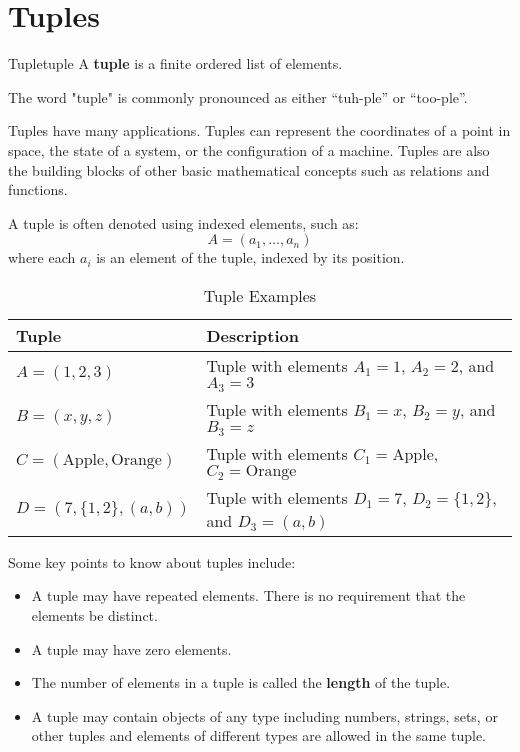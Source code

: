\section{Tuples}
\begin{definition}{Tuple}{tuple}
  A \textbf{tuple} is a finite ordered list of elements.
\end{definition}

The word "tuple" is commonly pronounced as either “tuh-ple” or “too-ple”.

Tuples have many applications. Tuples can represent the coordinates of a point in space,
the state of a system, or the configuration of a machine. Tuples are also the building
blocks of other basic mathematical concepts such as relations and functions.

A tuple is often denoted using indexed elements, such as:
\[
  A = (a_1, \ldots, a_n)
\]
where each \( a_i \) is an element of the tuple, indexed by its position.

\begin{table}[H]
  \centering
  \begin{tabular}{ll}
    \toprule
    \textbf{Tuple} & \textbf{Description} \\
    \midrule
    \( A = (1, 2, 3) \) & Tuple with elements \( A_1 = 1 \), \( A_2 = 2 \), and \( A_3 =3 \) \\
    \( B = (x, y, z) \) & Tuple with elements \( B_1 = x \), \( B_2 = y \), and \( B_3 = z \) \\
    \( C = (\text{Apple}, \text{Orange}) \) & Tuple with elements \( C_1 = \text{Apple} \), \( C_2 = \text{Orange} \) \\
    \( D = (7, \{1, 2\}, (a, b)) \) & Tuple with elements \( D_1 = 7 \), \( D_2 = \{1, 2\} \), and \( D_3 = (a, b) \) \\
    \bottomrule
  \end{tabular}
  \caption{Tuple Examples}
\end{table}

Some key points to know about tuples include:
\begin{itemize}
  \item A tuple may have repeated elements. There is no requirement that the elements be distinct.
  \item A tuple may have zero elements.
  \item The number of elements in a tuple is called the \textbf{length} of the tuple.
  \item A tuple may contain objects of any type including numbers, strings, sets, or other tuples
   and elements of different types are allowed in the same tuple.
\end{itemize}

